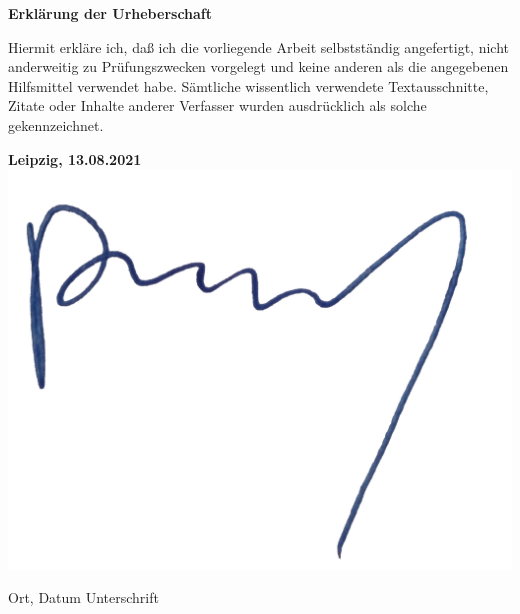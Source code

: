 \documentclass[a4paper, monochrome]{article}
\begin{document}


















\clearpage

%
%
%
\setcounter{biburllcpenalty}{7000}
\setcounter{biburlucpenalty}{8000}


\printbibliography[title=Literatur, keyword=literature]
\printbibliography[title=Software, keyword=software]
\printbibliography[title=Online, keyword=online]

\clearpage

\textbf{Erklärung der Urheberschaft}

\vspace{1cm}

Hiermit erkläre ich, daß ich die vorliegende Arbeit
selbstständig angefertigt, nicht anderweitig zu Prüfungszwecken vorgelegt und
keine anderen als die angegebenen Hilfsmittel verwendet habe. Sämtliche 
wissentlich verwendete Textausschnitte, Zitate oder Inhalte anderer Verfasser 
wurden ausdrücklich als solche gekennzeichnet.

\vfill

\hspace{2cm} \textbf{Leipzig, 13.08.2021} \hspace{2cm} \includegraphics[scale=0.3]{graphics/signature.png}


\vspace{1cm}

\hspace{2cm} Ort, Datum \hfill Unterschrift \hspace{2cm}
\end{document}

